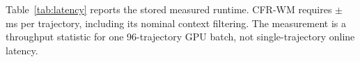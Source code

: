 Table~\ref{tab:latency} reports the stored measured runtime. CFR-WM requires
\CFRLatencyMean{} $\pm$ \CFRLatencySD{} ms per trajectory, including its
nominal context filtering. The measurement is a throughput statistic for one
96-trajectory GPU batch, not single-trajectory online latency.

\begin{table}[t]
\centering
\caption{Measured 25-step rollout time on the RTX 5070. Each cell uses one
batch of 96 trajectories and includes transfer, context encoding, and rollout;
SD is across seed-level cell-balanced means.}
\label{tab:latency}

\end{table}
